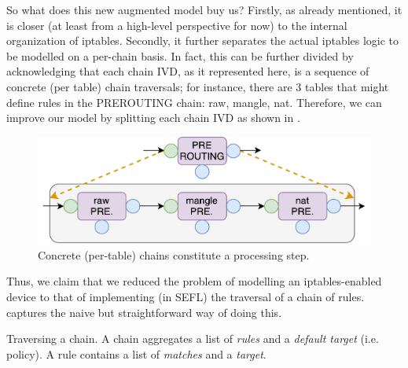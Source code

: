So what does this new augmented model buy us?  Firstly, as already mentioned,
it is closer (at least from a high-level perspective for now) to the internal
organization of iptables.  Secondly, it further separates the actual iptables
logic to be modelled on a per-chain basis.  In fact, this can be further
divided by acknowledging that each chain IVD, as it represented here, is a
sequence of concrete (per table) chain traversals; for instance, there are 3
tables that might define rules in the PREROUTING chain: raw, mangle, nat.
Therefore, we can improve our model by splitting each chain IVD as shown in
.

\begin{figure}[h]
  \centering
  \captionsetup{justification=centering}
  \includegraphics[scale=0.5]{src/img/iptables-2-composition}
  \caption{Concrete (per-table) chains constitute a processing step.}
  \label{fig:iptables-2-composition}
\end{figure}

Thus, we claim that we reduced the problem of modelling an iptables-enabled
device to that of implementing (in SEFL) the traversal of a chain of rules.
 captures the naive but
straightforward way of doing this.

\begin{algorithm}[H]

  \caption[Traversing a chain.]{Traversing a chain. A chain aggregates a list
  of \emph{rules} and a \emph{default target} (i.e. policy). A rule contains a
  list of \emph{matches} and a \emph{target}.}
  \label{algo:chain-traversal}
\end{algorithm}

